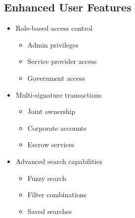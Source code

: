 \documentclass[12pt,a4paper]{article}
\begin{document}
    \subsection{Enhanced User Features}
    \begin{itemize}
        \item Role-based access control
        \begin{itemize}
            \item Admin privileges
            \item Service provider access
            \item Government access
        \end{itemize}

        \item Multi-signature transactions
        \begin{itemize}
            \item Joint ownership
            \item Corporate accounts
            \item Escrow services
        \end{itemize}

        \item Advanced search capabilities
        \begin{itemize}
            \item Fuzzy search
            \item Filter combinations
            \item Saved searches
        \end{itemize}
    \end{itemize}
\end{document}
